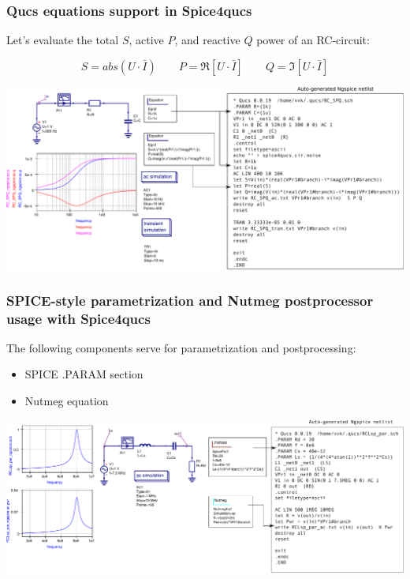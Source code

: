 \documentclass[9pt]{beamer}
\begin{document}
\begin{frame}
 \frametitle{Qucs equations support in Spice4qucs}
 
 Let's evaluate the total $S$, active $P$, and reactive $Q$ power of an 
RC-circuit:

\begin{equation}
 S = abs (U \cdot \bar{I}) \qquad P = \Re [U \cdot \bar{I}]
 \qquad Q = \Im [U \cdot \bar{I}]
\end{equation}

\includegraphics[width=1.05\textwidth]{img/RC_SPQ.pdf}

    
\end{frame}


\begin{frame}
 \frametitle{SPICE-style parametrization and Nutmeg postprocessor usage with 
Spice4qucs}

The following components serve for parametrization and postprocessing:
\begin{itemize}
 \item SPICE .PARAM section
 \item Nutmeg equation
\end{itemize}


\includegraphics[width=1.05\textwidth]{img/RCLp.pdf}
\end{frame}
\end{document}
